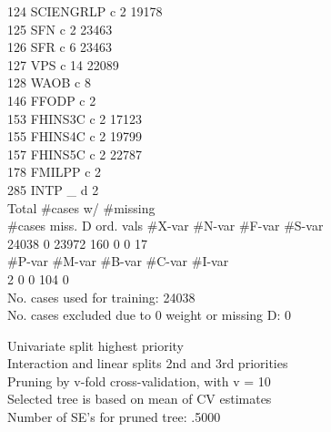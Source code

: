 \documentclass[12pt]{article}
\begin{document}
     124  SCIENGRLP  c                                  2     19178\\
     125  SFN        c                                  2     23463\\
     126  SFR        c                                  6     23463\\
     127  VPS        c                                 14     22089\\
     128  WAOB       c                                  8\\
     146  FFODP      c                                  2\\
     153  FHINS3C    c                                  2     17123\\
     155  FHINS4C    c                                  2     19799\\
     157  FHINS5C    c                                  2     22787\\
     178  FMILPP     c                                  2\\
     285  INTP \_       d                                  2\\
  
      Total  \#cases w/   \#missing\\
     \#cases    miss. D  ord. vals   \#X-var   \#N-var   \#F-var   \#S-var\\
      24038          0      23972      160        0        0       17\\
     \#P-var   \#M-var   \#B-var   \#C-var   \#I-var\\
          2        0        0      104        0\\
 No. cases used for training: 24038\\
 No. cases excluded due to 0 weight or missing D: 0
  
 Univariate split highest priority\\
 Interaction and linear splits 2nd and 3rd priorities\\
 Pruning by v-fold cross-validation, with v = 10\\
 Selected tree is based on mean of CV estimates\\
 Number of SE's for pruned tree: .5000
  
\end{document}
